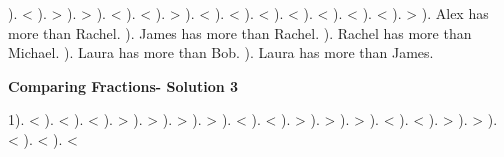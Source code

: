 \documentclass{article}%
\begin{document}
). <%
). >%
). >%
). <%
). <%
). >%
). <%
). <%
). <%
). <%
). <%
). <%
). <%
). >%
). Alex has more than Rachel.%
). James has more than Rachel.%
). Rachel has more than Michael.%
). Laura has more than Bob.%
). Laura has more than James.%
\newline%
\newpage%
\large%
\begin{center}%
\textbf{Comparing Fractions- Solution 3}%
\newline%
\end{center} \normalsize%
1). <%
). <%
). <%
). >%
). >%
). >%
). >%
). <%
). <%
). >%
). >%
). >%
). <%
). <%
). >%
). >%
). <%
). <%
). <%
\newline%
\end{document}

